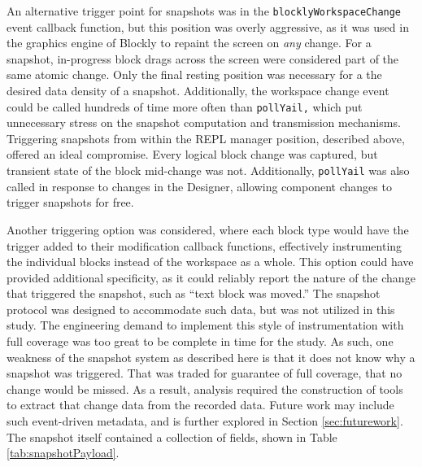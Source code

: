 An alternative trigger point for snapshots was in the \texttt{blocklyWorkspaceChange} event callback function, but this position was overly aggressive, as it was used in the graphics engine of Blockly to repaint the screen on \emph{any} change. For a snapshot, in-progress block drags across the screen were considered part of the same atomic change. Only the final resting position was necessary for a the desired data density of a snapshot. Additionally, the workspace change event could be called hundreds of time more often than \texttt{pollYail,} which put unnecessary stress on the snapshot computation and transmission mechanisms. Triggering snapshots from within the REPL manager position, described above, offered an ideal compromise. Every logical block change was captured, but transient state of the block mid-change was not. Additionally, \texttt{pollYail} was also called in response to changes in the Designer, allowing component changes to trigger snapshots for free.

Another triggering option was considered, where each block type would have the trigger added to their modification callback functions, effectively instrumenting the individual blocks instead of the workspace as a whole. This option could have provided additional specificity, as it could reliably report the nature of the change that triggered the snapshot, such as ``text block was moved.'' The snapshot protocol was designed to accommodate such data, but was not utilized in this study. The engineering demand to implement this style of instrumentation with full coverage was too great to be complete in time for the study. As such, one weakness of the snapshot system as described here is that it does not know why a snapshot was triggered. That was traded for guarantee of full coverage, that no change would be missed. As a result, analysis required the construction of tools to extract that change data from the recorded data. Future work may include such event-driven metadata, and is further explored in Section \ref{sec:futurework}. The snapshot itself contained a collection of fields, shown in Table \ref{tab:snapshotPayload}. 

